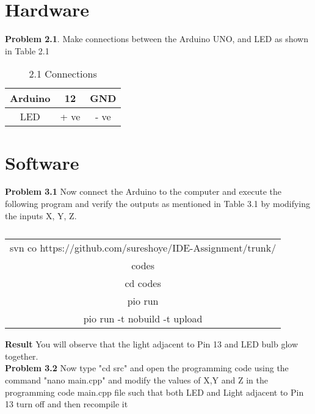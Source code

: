 \documentclass[journal,12pt,twocolumn]{IEEEtran}
\begin{document}
\section{Hardware}

\textbf{Problem 2.1}. Make connections between the Arduino UNO, and LED as shown in Table 2.1 \\


\begin{table}[h]
    	\centering
	\begin{tabular}{| c | c | c |}
	\hline
	Arduino & 12 & GND \\
	\hline
	LED & + ve & - ve \\
	\hline

	\hline
\end{tabular}
\caption{2.1 Connections}
\end{table}
\section{Software}
\textbf{Problem 3.1} Now connect the Arduino to the computer and execute the following program and verify the outputs as mentioned in Table 3.1 by modifying the inputs X, Y, Z.\\
\begin{table}[h]
	\raggedleft
	\begin{tabular}{| c |}
	\hline
	svn co https://github.com/sureshoye/IDE-Assignment/trunk/\\codes\\
	
	
	cd codes \\

	pio run \\

	pio run -t nobuild -t upload \\
    	
	\hline
        \end{tabular}

	\caption{}
 \end{table}
 
 \textbf{Result} You will observe that the light adjacent to Pin 13 and LED bulb glow together.
 \\
 \textbf{Problem 3.2} Now type "cd src" and open the programming code using the command "nano main.cpp" and modify the values of X,Y and Z in the programming code main.cpp file such that both LED and Light adjacent to Pin 13 turn off and then recompile it
\\
\end{document}
